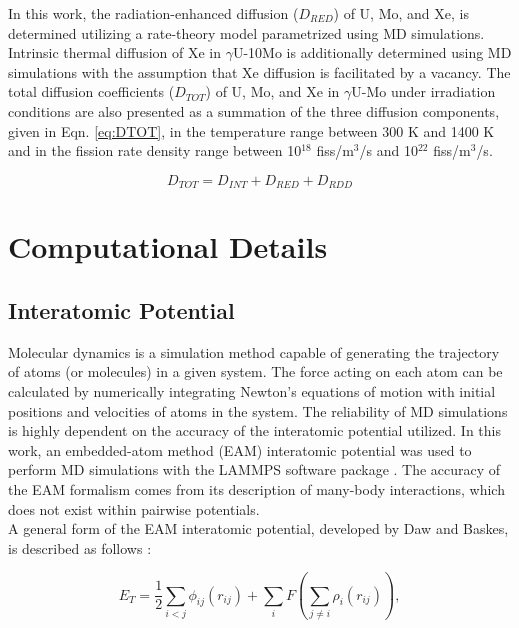 \documentclass[preprint,12pt]{elsarticle}
\begin{document}
In this work, the radiation-enhanced diffusion ($D_{RED}$) of U, Mo, and Xe, is determined utilizing a rate-theory model parametrized using MD simulations. Intrinsic thermal diffusion of Xe in $\gamma$U-10Mo is additionally determined using MD simulations with the assumption that Xe diffusion is facilitated by a vacancy. The total diffusion coefficients ($D_{TOT}$) of U, Mo, and Xe in $\gamma$U-Mo under irradiation conditions are also presented as a summation of the three diffusion components, given in Eqn. \ref{eq:DTOT}, in the temperature range between 300 K and 1400 K and in the fission rate density range between 10$^{18}$ fiss/m$^{3}$/s and 10$^{22}$ fiss/m$^{3}$/s.

\begin{equation}\label{eq:DTOT}
D_{TOT} = D_{INT} + D_{RED} + D_{RDD}
\end{equation}

\section{Computational Details}
\subsection{Interatomic Potential}
Molecular dynamics is a simulation method capable of generating the trajectory of atoms (or molecules) in a given system. The force acting on each atom can be calculated by numerically integrating Newton's equations of motion with initial positions and velocities of atoms in the system. The reliability of MD simulations is highly dependent on the accuracy of the interatomic potential utilized. In this work, an embedded-atom method (EAM) interatomic potential was used to perform MD simulations with the LAMMPS software package \cite{plimpton1995fast}. The accuracy of the EAM formalism comes from its description of many-body interactions, which does not exist within pairwise potentials. \\
\indent A general form of the EAM interatomic potential, developed by Daw and Baskes, is described as follows \cite{daw1983semiempirical, daw1984embedded}:

\begin{equation}
\label{eq:eam}
E_{T} = \frac{1}{2}\sum_{i<j}\phi_{ij}({r_{ij}}) + \sum_{i}F(\sum_{j\neq i}\rho_{i}(r_{ij})), 
\end{equation}
\end{document}
